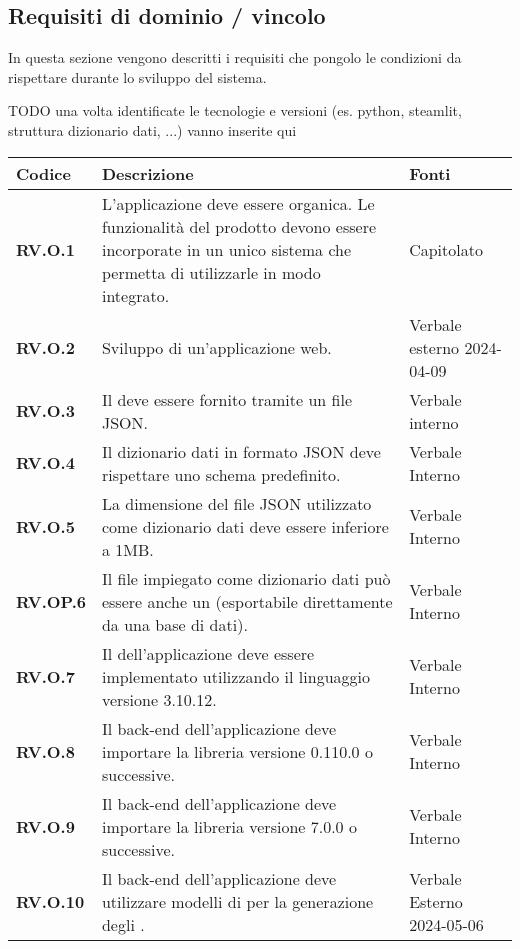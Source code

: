 \subsection{Requisiti di dominio / vincolo}
In questa sezione vengono descritti i requisiti che pongolo le condizioni da rispettare durante lo sviluppo del sistema.

TODO una volta identificate le tecnologie e versioni (es. python, steamlit, struttura dizionario dati, ...) vanno inserite qui
\begin{longtable}{|P{3cm}|P{6,5cm}|>{\arraybackslash}P{4cm}|}
  \hline
  \textbf{Codice} & \textbf{Descrizione} & \textbf{Fonti} \\
  \hline
  \textbf{RV.O.1} & L'applicazione deve essere organica. Le funzionalità del prodotto devono essere incorporate in un unico sistema che permetta di utilizzarle in modo integrato. & Capitolato \\
  \hline
  \textbf{RV.O.2} & Sviluppo di un'applicazione web. & Verbale esterno 2024-04-09 \\
  \hline
  \textbf{RV.O.3} & Il  deve essere fornito tramite un file JSON. & Verbale interno \\
  \hline
  \textbf{RV.O.4} & Il dizionario dati in formato JSON deve rispettare uno schema predefinito. & Verbale Interno \\
  \hline
  \textbf{RV.O.5} & La dimensione del file JSON utilizzato come dizionario dati deve essere inferiore a 1MB. & Verbale Interno \\
  \hline
  \textbf{RV.OP.6} & Il file impiegato come dizionario dati può essere anche un  (esportabile direttamente da una base di dati). & Verbale Interno \\
  \hline
  \textbf{RV.O.7} & Il  dell'applicazione deve essere implementato utilizzando il linguaggio  versione 3.10.12. & Verbale Interno \\
  \hline
  \textbf{RV.O.8} & Il back-end dell'applicazione deve importare la libreria  versione 0.110.0 o successive. & Verbale Interno \\
  \hline
  \textbf{RV.O.9} & Il back-end dell'applicazione deve importare la libreria  versione 7.0.0 o successive. & Verbale Interno \\
  \hline
  \textbf{RV.O.10} & Il back-end dell'applicazione deve utilizzare modelli di  per la generazione degli . & Verbale Esterno 2024-05-06 \\

\end{longtable}
